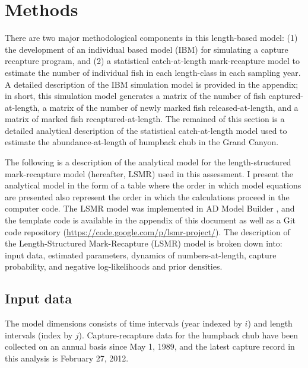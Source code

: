\section{Methods} %
\label{sec:methods}

There are two major methodological components in this length-based model: (1) the development of an individual based model (IBM) for simulating a capture recapture program, and (2) a statistical catch-at-length mark-recapture model to estimate the number of individual fish in each length-class in each sampling year.  A detailed description of the IBM simulation model is provided in the appendix; in short, this simulation model generates a matrix of the number of fish captured-at-length, a matrix of the number of newly marked fish released-at-length, and a matrix of marked fish recaptured-at-length.  The remained of this section is a detailed analytical description of the statistical catch-at-length model used to estimate the abundance-at-length of humpback chub in the Grand Canyon.

The following is a description of the analytical model for the length-structured mark-recapture model (hereafter, LSMR) used in this assessment.  I present the analytical model in the form of a table where the order in which model equations are presented also represent the order in which the calculations proceed in the computer code. The LSMR model was implemented in AD Model Builder \citep{fournier2011ad}, and the template code is available in the appendix of this document as well as a Git code repository (\url{https://code.google.com/p/lsmr-project/}).  The description of the Length-Structured Mark-Recapture (LSMR) model is broken down into: input data, estimated parameters, dynamics of numbers-at-length, capture probability, and negative log-likelihoods and prior densities.


\subsection{Input data} %
\label{sub:input_data}

The model dimensions consists of time intervals (year indexed by $i$) and length intervals (index by $j$).  Capture-recapture data for the humpback chub have been collected on an annual basis since May 1, 1989,  and the latest capture record in this analysis is February 27, 2012.


